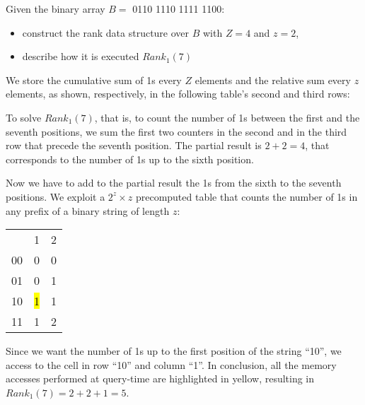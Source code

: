 \exercise

Given the binary array $B =$ 0110 1110 1111 1100:
%
\begin{itemize}
  \item construct the rank data structure over $B$ with $Z=4$ and $z=2$,
  \item describe how it is executed $Rank_1(7)$
\end{itemize}

\solution

We store the cumulative sum of 1s every $Z$ elements and the relative sum every
$z$ elements, as shown, respectively, in the following table's second and third
rows:
%
\begin{table}[h]
\end{table}

To solve $Rank_1(7)$, that is, to count the number of 1s between the first and
the seventh positions, we sum the first two counters in the second and in the
third row that precede the seventh position. The partial result is $2+2=4$, that
corresponds to the number of 1s up to the sixth position.

Now we have to add to the partial result the 1s from the sixth to the seventh
positions. We exploit a $2^z \times z$ precomputed table that counts the number
of 1s in any prefix of a binary string of length $z$:
%
\begin{center}
  \begin{tabular}{ l | c  c }
    \multicolumn{1}{l}{} & \multicolumn{1}{c}{1} & \multicolumn{1}{l}{2} \\
    \cline{2-3}
    00 & 0 & 0 \\
    01 & 0 & 1 \\
    10 & \hl{1} & 1 \\
    11 & 1 & 2 \\
  \end{tabular}
\end{center}
%
Since we want the number of 1s up to the first position of the string ``10'', we
access to the cell in row ``10'' and column ``1''. In conclusion, all the memory
accesses performed at query-time are highlighted in yellow, resulting in
$Rank_1(7)=2+2+1=5$.

